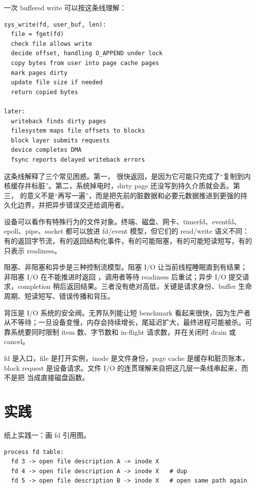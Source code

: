 一次 buffered write 可以按这条线理解：

\begin{lstlisting}
sys_write(fd, user_buf, len):
  file = fget(fd)
  check file allows write
  decide offset, handling O_APPEND under lock
  copy bytes from user into page cache pages
  mark pages dirty
  update file size if needed
  return copied bytes

later:
  writeback finds dirty pages
  filesystem maps file offsets to blocks
  block layer submits requests
  device completes DMA
  fsync reports delayed writeback errors
\end{lstlisting}

这条线解释了三个常见困惑。第一， 很快返回，是因为它可能只完成了“复制到内核缓存并标脏”。第二，系统掉电时，dirty page 还没写到持久介质就会丢。第三， 的意义不是“再写一遍”，而是把先前的脏数据和必要元数据推进到更强的持久化边界，并把异步错误交还给调用者。

设备可以看作有特殊行为的文件对象。终端、磁盘、网卡、timerfd、eventfd、epoll、pipe、socket 都可以放进 fd/event 模型，但它们的 read/write 语义不同：有的返回字节流，有的返回结构化事件，有的可能阻塞，有的可能短读短写，有的只表示 readiness。

阻塞、非阻塞和异步是三种控制流模型。阻塞 I/O 让当前线程睡眠直到有结果；非阻塞 I/O 在不能推进时返回 ，调用者等待 readiness 后重试；异步 I/O 提交请求，completion 稍后返回结果。三者没有绝对高低，关键是请求身份、buffer 生命周期、短读短写、错误传播和背压。

背压是 I/O 系统的安全阀。无界队列能让短 benchmark 看起来很快，因为生产者从不等待；一旦设备变慢，内存会持续增长，尾延迟扩大，最终进程可能被杀。可靠系统要同时限制 item 数、字节数和 in-flight 请求数，并在关闭时 drain 或 cancel。

\begin{keyidea}
fd 是入口，file 是打开实例，inode 是文件身份，page cache 是缓存和脏页账本，block request 是设备请求。文件 I/O 的连贯理解来自把这几层一条线串起来，而不是把  当成直接磁盘函数。
\end{keyidea}

\section{实践}

纸上实践一：画 fd 引用图。

\begin{lstlisting}
process fd table:
  fd 3 -> open file description A -> inode X
  fd 4 -> open file description A -> inode X   # dup
  fd 5 -> open file description B -> inode X   # open same path again
\end{lstlisting}

